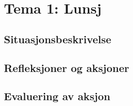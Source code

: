 \chapter{Tema 1: Lunsj}
\section{Situasjonsbeskrivelse}
\section{Refleksjoner og aksjoner}
\section{Evaluering av aksjon} 
